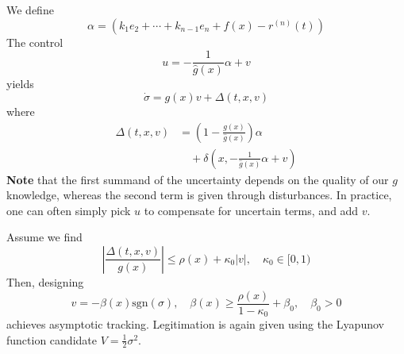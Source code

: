 We define
\begin{equation*}
    \alpha = \left(k_1e_2 + \cdots + k_{n-1}e_n + f(x) - r^{(n)}(t)\right)
\end{equation*}
The control
\begin{equation*}
    u = -\frac{1}{\hat{g}(x)}\alpha + v
\end{equation*}
yields
\begin{equation*}
    \dot{\sigma} = g(x)v + \Delta(t, x, v)
\end{equation*}
where
\begin{align*}
    \Delta(t, x, v) & = \left(1 - \frac{g(x)}{\hat{g}(x)}\right)\alpha              \\
                    & \quad + \delta\left(x, -\frac{1}{\hat{g}(x)}\alpha + v\right)
\end{align*}
\textbf{Note} that the first summand of the uncertainty depends on the quality of our $g$ knowledge, whereas the second term is given through disturbances. In practice, one can often simply pick $u$ to compensate for uncertain terms, and add $v$.

\newpar{}

Assume we find
\begin{equation*}
    \left| \frac{\Delta(t, x, v)}{g(x)} \right| \leq \rho(x) + \kappa_0|v|, \quad \kappa_0 \in [0, 1)       %
\end{equation*}
Then, designing
\begin{equation*}
    v = -\beta(x)\text{sgn}(\sigma), \quad \beta(x) \geq \frac{\rho(x)}{1 - \kappa_0} + \beta_0,\quad \beta_0 > 0
\end{equation*}
achieves asymptotic tracking.
\newpar{}
Legitimation is again given using the Lyapunov function candidate $V = \frac{1}{2}\sigma^2$.


